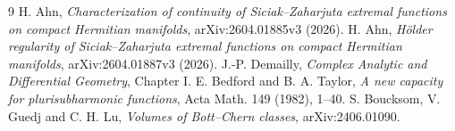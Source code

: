 \documentclass[11pt]{article}
\theoremstyle{remark}\newtheorem{remark}[theorem]{Remark}
\begin{document}
\begin{thebibliography}{9}
 H. Ahn, \emph{Characterization of continuity of
Siciak--Zaharjuta extremal functions on compact Hermitian manifolds},
arXiv:2604.01885v3 (2026).
 H. Ahn, \emph{H\"older regularity of Siciak--Zaharjuta
extremal functions on compact Hermitian manifolds},
arXiv:2604.01887v3 (2026).
 J.-P. Demailly, \emph{Complex Analytic and Differential
Geometry}, Chapter I.
 E. Bedford and B. A. Taylor, \emph{A new capacity for
plurisubharmonic functions}, Acta Math. 149 (1982), 1--40.
 S. Boucksom, V. Guedj and C. H. Lu,
\emph{Volumes of Bott--Chern classes}, arXiv:2406.01090.
\end{thebibliography}
\end{document}
